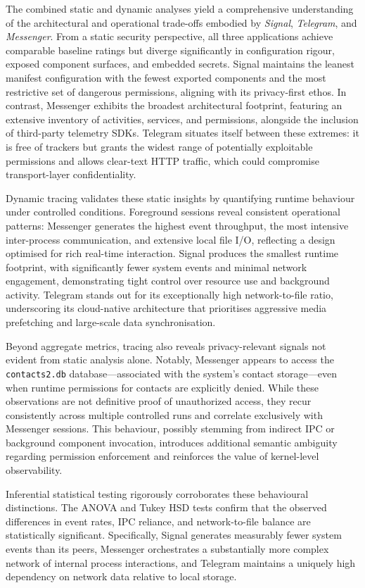 \documentclass[a4paper,12pt]{report}
\begin{document}
The combined static and dynamic analyses yield a comprehensive understanding of the architectural and operational trade-offs embodied by \textit{Signal}, \textit{Telegram}, and \textit{Messenger}. From a static security perspective, all three applications achieve comparable baseline ratings but diverge significantly in configuration rigour, exposed component surfaces, and embedded secrets. Signal maintains the leanest manifest configuration with the fewest exported components and the most restrictive set of dangerous permissions, aligning with its privacy-first ethos. In contrast, Messenger exhibits the broadest architectural footprint, featuring an extensive inventory of activities, services, and permissions, alongside the inclusion of third-party telemetry SDKs. Telegram situates itself between these extremes: it is free of trackers but grants the widest range of potentially exploitable permissions and allows clear-text HTTP traffic, which could compromise transport-layer confidentiality.

Dynamic tracing validates these static insights by quantifying runtime behaviour under controlled conditions. Foreground sessions reveal consistent operational patterns: Messenger generates the highest event throughput, the most intensive inter-process communication, and extensive local file I/O, reflecting a design optimised for rich real-time interaction. Signal produces the smallest runtime footprint, with significantly fewer system events and minimal network engagement, demonstrating tight control over resource use and background activity. Telegram stands out for its exceptionally high network-to-file ratio, underscoring its cloud-native architecture that prioritises aggressive media prefetching and large-scale data synchronisation.

Beyond aggregate metrics, tracing also reveals privacy-relevant signals not evident from static analysis alone. Notably, Messenger appears to access the \texttt{contacts2.db} database—associated with the system’s contact storage—even when runtime permissions for contacts are explicitly denied. While these observations are not definitive proof of unauthorized access, they recur consistently across multiple controlled runs and correlate exclusively with Messenger sessions. This behaviour, possibly stemming from indirect IPC or background component invocation, introduces additional semantic ambiguity regarding permission enforcement and reinforces the value of kernel-level observability.

Inferential statistical testing rigorously corroborates these behavioural distinctions. The ANOVA and Tukey HSD tests confirm that the observed differences in event rates, IPC reliance, and network-to-file balance are statistically significant. Specifically, Signal generates measurably fewer system events than its peers, Messenger orchestrates a substantially more complex network of internal process interactions, and Telegram maintains a uniquely high dependency on network data relative to local storage.
\end{document}
